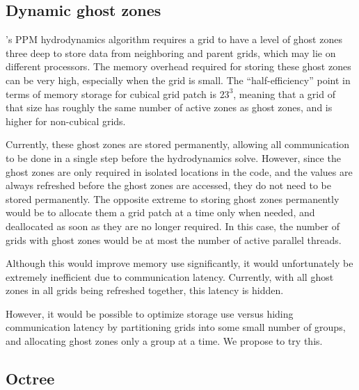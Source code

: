 \documentclass{article}
\begin{document}
\subsection{Dynamic ghost zones} \label{solution:amr-dynamic-ghosts}

  \enzo's PPM hydrodynamics algorithm requires a grid to have a level
  of ghost zones three deep to store data from neighboring and parent
  grids, which may lie on different processors.  The memory overhead
  required for storing these ghost zones can be very high, especially
  when the grid is small.  The ``half-efficiency'' point in terms of
  memory storage for cubical grid patch is $23^3$, meaning that a grid
  of that size has roughly the same number of active zones as ghost
  zones, and is higher for non-cubical grids.

  Currently, these ghost zones are stored permanently, allowing all
  communication to be done in a single step before the hydrodynamics
  solve.  However, since the ghost zones are only required in isolated
  locations in the code, and the values are always refreshed before
  the ghost zones are accessed, they do not need to be stored
  permanently.  The opposite extreme to storing ghost zones
  permanently would be to allocate them a grid patch at a time only
  when needed, and deallocated as soon as they are no longer required.
  In this case, the number of grids with ghost zones would be at most
  the number of active parallel threads.

  Although this would improve memory use significantly, it would
  unfortunately be extremely inefficient due to communication latency.
  Currently, with all ghost zones in all grids being refreshed
  together, this latency is hidden.

  However, it would be possible to optimize storage use versus hiding
  communication latency by partitioning grids into some small number
  of groups, and allocating ghost zones only a group at a time.  We
  propose to try this.

\subsection{Octree} \label{solution:amr-octree}
\end{document}
